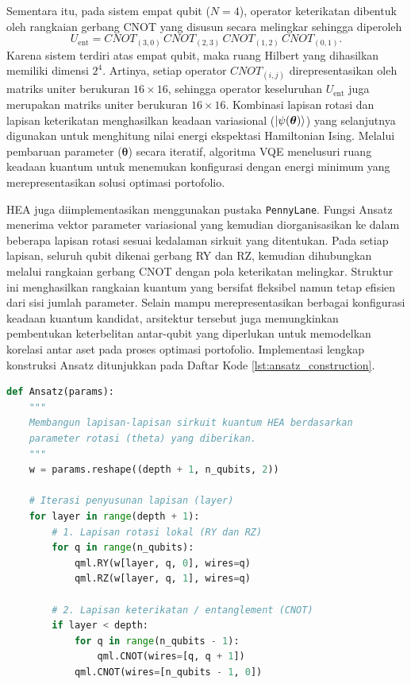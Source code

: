 Sementara itu, pada sistem empat qubit (\(N=4\)), operator keterikatan dibentuk oleh rangkaian gerbang CNOT yang disusun secara melingkar sehingga diperoleh
\begin{equation}
U_{\mathrm{ent}}
=
CNOT_{(3,0)}
\,CNOT_{(2,3)}
\,CNOT_{(1,2)}
\,CNOT_{(0,1)}.
\end{equation}
Karena sistem terdiri atas empat qubit, maka ruang Hilbert yang dihasilkan memiliki dimensi $2^4$. Artinya, setiap operator \(CNOT_{(i,j)}\) direpresentasikan oleh matriks uniter berukuran \(16\times16\), sehingga operator keseluruhan \(U_{\mathrm{ent}}\) juga merupakan matriks uniter berukuran \(16\times16\). Kombinasi lapisan rotasi dan lapisan keterikatan menghasilkan keadaan variasional ($\ket{\psi(\boldsymbol{\theta})}$) yang selanjutnya digunakan untuk menghitung nilai energi ekspektasi Hamiltonian Ising. Melalui pembaruan parameter ($\boldsymbol{\theta}$) secara iteratif, algoritma VQE menelusuri ruang keadaan kuantum untuk menemukan konfigurasi dengan energi minimum yang merepresentasikan solusi optimasi portofolio.

HEA juga diimplementasikan menggunakan pustaka \texttt{PennyLane}. Fungsi Ansatz menerima vektor parameter variasional yang kemudian diorganisasikan ke dalam beberapa lapisan rotasi sesuai kedalaman sirkuit yang ditentukan. Pada setiap lapisan, seluruh qubit dikenai gerbang RY dan RZ, kemudian dihubungkan melalui rangkaian gerbang CNOT dengan pola keterikatan melingkar. Struktur ini menghasilkan rangkaian kuantum yang bersifat fleksibel namun tetap efisien dari sisi jumlah parameter. Selain mampu merepresentasikan berbagai konfigurasi keadaan kuantum kandidat, arsitektur tersebut juga memungkinkan pembentukan keterbelitan antar-qubit yang diperlukan untuk memodelkan korelasi antar aset pada proses optimasi portofolio. Implementasi lengkap konstruksi Ansatz ditunjukkan pada Daftar Kode \ref{lst:ansatz_construction}.

\begin{lstlisting}[language=Python, caption={Fungsi penyusunan arsitektur HEA pada iterasi sirkuit kuantum VQE}, label={lst:ansatz_construction}]
def Ansatz(params):
    """
    Membangun lapisan-lapisan sirkuit kuantum HEA berdasarkan
    parameter rotasi (theta) yang diberikan.
    """
    w = params.reshape((depth + 1, n_qubits, 2))
    
    # Iterasi penyusunan lapisan (layer)
    for layer in range(depth + 1):
        # 1. Lapisan rotasi lokal (RY dan RZ)
        for q in range(n_qubits):
            qml.RY(w[layer, q, 0], wires=q)
            qml.RZ(w[layer, q, 1], wires=q)
            
        # 2. Lapisan keterikatan / entanglement (CNOT)
        if layer < depth:
            for q in range(n_qubits - 1):
                qml.CNOT(wires=[q, q + 1])
            qml.CNOT(wires=[n_qubits - 1, 0])
\end{lstlisting}
